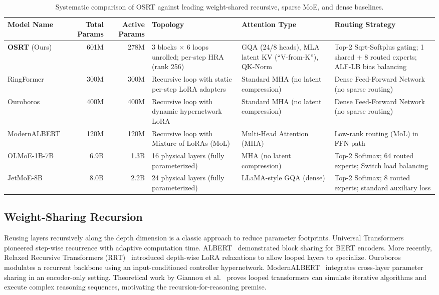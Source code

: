 \documentclass[11pt,twocolumn]{article}
\begin{document}
\begin{table}[t]
\centering
\small
\setlength{\tabcolsep}{3pt}
\begin{tabular}{lrr p{0.9in} p{0.9in} p{1.2in}}
\toprule
\textbf{Model Name} & \textbf{Total Params} & \textbf{Active Params} & \textbf{Topology} & \textbf{Attention Type} & \textbf{Routing Strategy} \\
\midrule
\textbf{OSRT} (Ours) & 601M & 278M & 3 blocks $\times$ 6 loops unrolled; per-step HRA (rank 256) & GQA (24/8 heads), MLA latent KV (``V-from-K''), QK-Norm & Top-2 Sqrt-Softplus gating; 1 shared + 8 routed experts; ALF-LB bias balancing \\
\midrule
RingFormer~\cite{bae2024} & ~300M & ~300M & Recursive loop with static per-step LoRA adapters & Standard MHA (no latent compression) & Dense Feed-Forward Network (no sparse routing) \\
\midrule
Ouroboros~\cite{ouroboros2026} & ~400M & ~400M & Recursive loop with dynamic hypernetwork LoRA & Standard MHA (no latent compression) & Dense Feed-Forward Network (no sparse routing) \\
\midrule
ModernALBERT~\cite{modernalbert2025} & ~120M & ~120M & Recursive loop with Mixture of LoRAs (MoL) & Multi-Head Attention (MHA) & Low-rank routing (MoL) in FFN path \\
\midrule
OLMoE-1B-7B~\cite{olmoe2024} & 6.9B & 1.3B & 16 physical layers (fully parameterized) & MHA (no latent compression) & Top-2 Softmax; 64 routed experts; Switch load balancing \\
\midrule
JetMoE-8B~\cite{jetmoe2024} & 8.0B & 2.2B & 24 physical layers (fully parameterized) & LLaMA-style GQA (dense) & Top-2 Softmax; 8 routed experts; standard auxiliary loss \\
\bottomrule
\end{tabular}
\caption{Systematic comparison of OSRT against leading weight-shared recursive, sparse MoE, and dense baselines.}
\label{tab:comparison}
\end{table}

\subsection{Weight-Sharing Recursion}
Reusing layers recursively along the depth dimension is a classic approach to reduce parameter footprints. Universal Transformers~\cite{dehghani2018} pioneered step-wise recurrence with adaptive computation time. ALBERT~\cite{albert2019} demonstrated block sharing for BERT encoders. More recently, Relaxed Recursive Transformers (RRT)~\cite{bae2024} introduced depth-wise LoRA relaxations to allow looped layers to specialize. Ouroboros~\cite{ouroboros2026} modulates a recurrent backbone using an input-conditioned controller hypernetwork. ModernALBERT~\cite{modernalbert2025} integrates cross-layer parameter sharing in an encoder-only setting. Theoretical work by Giannou et al.~\cite{giannou2023,latentthoughts2025} proves looped transformers can simulate iterative algorithms and execute complex reasoning sequences, motivating the recursion-for-reasoning premise.
\end{document}
